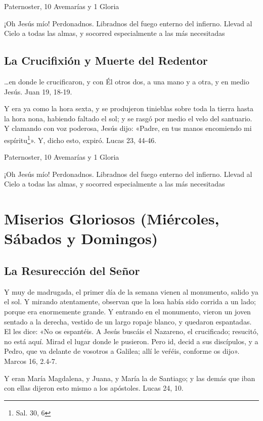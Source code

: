 \documentclass[a4paper,11pt, oneside]{report}
\begin{document}
      \medskip
       Paternoster, 10 Avemarías y 1 Gloria
      
      \medskip
      ¡Oh Jesús mío! Perdonadnos. Libradnos del fuego enterno del infierno. Llevad al Cielo a todas las almas, y socorred especialmente a las más 
      necesitadas
    
    \subsection*{La Crucifixión y Muerte del Redentor}
      {\ldots}en donde le crucificaron, y con Él otros dos, a una mano y a otra, y en medio Jesús. Juan 19, 18-19.

      \medskip
      Y era ya como la hora sexta, y se produjeron tinieblas sobre toda la tierra hasta la hora nona, habiendo faltado el sol; y se rasgó por medio 
      el velo del santuario. Y clamando con voz poderosa, Jesús dijo: «Padre, en tus manos encomiendo mi espíritu\footnote{Sal. 30, 6}». 
      Y, dicho esto, expiró. Lucas 23, 44-46.
      
       Paternoster, 10 Avemarías y 1 Gloria
      
      \medskip
      ¡Oh Jesús mío! Perdonadnos. Libradnos del fuego enterno del infierno. Llevad al Cielo a todas las almas, y socorred especialmente a las más 
      necesitadas
      
  \section*{Miserios Gloriosos (Miércoles, Sábados y Domingos)}
    \subsection*{La Resurección del Señor}
      Y muy de madrugada, el primer día de la semana vienen al monumento, salido ya el sol. Y mirando atentamente, observan que la losa había
      sido corrida a un lado; porque era enormemente grande. Y entrando en el monumento, vieron un joven sentado a la derecha, vestido de un largo
      ropaje blanco, y quedaron espantadas. El les dice: «No os espantéis. A Jesús buscáis el Nazareno, el crucificado; resucitó, no está aquí. Mirad
      el lugar donde le pusieron. Pero id, decid a sus discípulos, y a Pedro, que va delante de vosotros a Galilea; allí le veŕéis, conforme os dijo».
      Marcos 16, 2.4-7.

      \medskip
      Y eran María Magdalena, y Juana, y María la de Santiago; y las demás que iban con ellas dijeron esto mismo a los apóstoles. 
      Lucas 24, 10.
\end{document}

